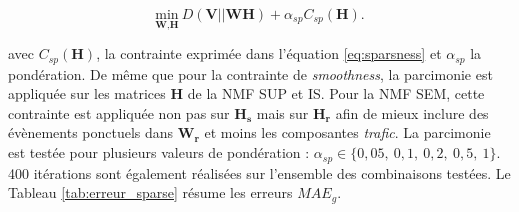 \begin{equation}
\underset{\textbf{W},\textbf{H}}{\text{min}}~D\left(\textbf{V} \vert\vert \textbf{WH}\right) + \alpha_{sp} C_{sp}(\mathbf{H}).
\end{equation}

avec $C_{sp}(\mathbf{H})$, la contrainte exprimée dans l'équation \ref{eq:sparsness} et $\alpha_{sp}$ la pondération. De même que pour la contrainte de \textit{smoothness}, la parcimonie est appliquée sur les matrices $\mathbf{H}$ de la NMF SUP et IS. Pour la NMF SEM, cette contrainte est appliquée non pas sur $\mathbf{H_s}$ mais sur $\mathbf{H_r}$ afin de mieux inclure des évènements ponctuels dans $\mathbf{W_r}$ et moins les composantes \textit{trafic}. La parcimonie est testée pour plusieurs valeurs de pondération : $\alpha_{sp} \in \lbrace0,05,~ 0,1,~ 0,2,~ 0,5,~ 1\rbrace$. 400 itérations sont également réalisées sur l'ensemble des combinaisons testées. Le Tableau \ref{tab:erreur_sparse} résume les erreurs $MAE_g$.

\begin{table}[h!]
\centering
\caption{Erreurs $MAE_{60}$ les plus faibles pour les combinaisons optimales des modalités des estimateurs pour le corpus d'évaluation \textit{SOUR} en présence d'une pondération de parcimonie.}
\label{tab:erreur_sparse}
\end{table}

